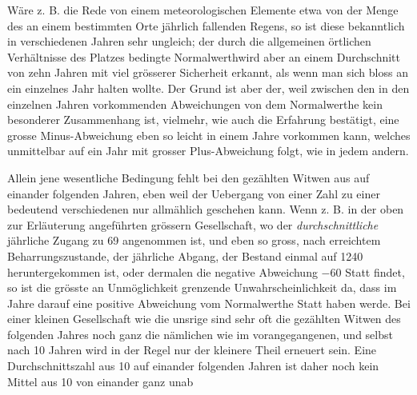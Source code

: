 Wäre z. B. die Rede von einem meteorologischen Elemente etwa von der Menge des an einem bestimmten Orte jährlich fallenden Regens, so ist diese bekanntlich in verschiedenen Jahren sehr ungleich; der durch die allgemeinen örtlichen Verhältnisse des Platzes bedingte Normalwerthwird aber an einem Durchschnitt von zehn Jahren mit viel grösserer Sicherheit erkannt, als wenn man sich bloss an ein einzelnes Jahr halten wollte. Der Grund ist aber der, weil zwischen den in den einzelnen Jahren vorkommenden Abweichungen von dem Normalwerthe kein besonderer Zusammenhang ist, vielmehr, wie auch die Erfahrung bestätigt, eine grosse Minus-Abweichung eben so leicht in einem Jahre vorkommen kann, welches unmittelbar auf ein Jahr mit grosser Plus-Abweichung folgt, wie in jedem andern.

Allein jene wesentliche Bedingung fehlt bei den gezählten Witwen aus auf einander folgenden Jahren, eben weil der Uebergang von einer Zahl zu einer bedeutend verschiedenen nur allmählich geschehen kann. Wenn z. B. in der oben zur Erläuterung angeführten grössern Gesellschaft, wo der \textit{durchschnittliche} jährliche Zugang zu 69 angenommen ist, und eben so gross, nach erreichtem Beharrungszustande, der jährliche Abgang, der Bestand einmal auf 1240 heruntergekommen ist, oder dermalen die negative Abweichung \(-60\) Statt findet, so ist die grösste an Unmöglichkeit grenzende Unwahrscheinlichkeit da, dass im Jahre darauf eine positive Abweichung vom Normalwerthe Statt haben werde. Bei einer kleinen Gesellschaft wie die unsrige sind sehr oft die gezählten Witwen des folgenden Jahres noch ganz die nämlichen wie im vorangegangenen, und selbst nach 10 Jahren wird in der Regel nur der kleinere Theil erneuert sein. Eine Durchschnittszahl aus 10 auf einander folgenden Jahren ist daher noch kein Mittel aus 10 von einander ganz unab%
